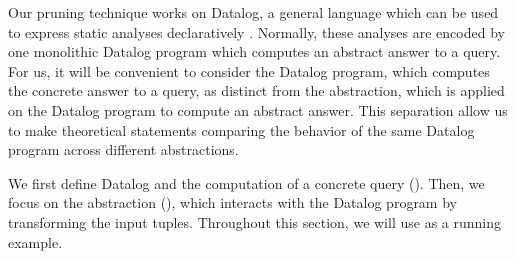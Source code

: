 
Our pruning technique works on Datalog, a general language which can be used to
express static analyses declaratively \cite{Whaley2007,bravenboer}.  Normally,
these analyses are encoded by one monolithic Datalog program which computes an
abstract answer to a query.  For us, it will be convenient to consider the
Datalog program, which computes the concrete answer to a query, as distinct
from the abstraction, which is applied on the Datalog program to compute an
abstract answer.  This separation allow us to make theoretical statements
comparing the behavior of the same Datalog program across different
abstractions.

We first define Datalog and the computation of a concrete query
().  Then, we focus on the abstraction (),
which interacts with the Datalog program by transforming the input tuples.
Throughout this section, we will use  as a running example.

